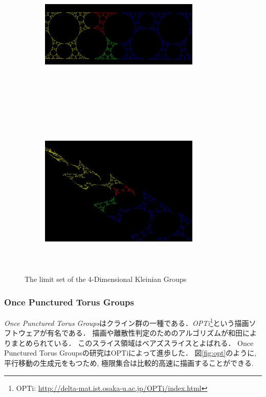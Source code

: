 \begin{figure}[h!tbp]
 \begin{subfigure}{0.49\hsize}
   \begin{center}
    \includegraphics[width=3in, height=3in, keepaspectratio]{../img/klein/sakugawa1.pdf}
    \caption{}
    \label{fig:sakugawa1}
   \end{center}
 \end{subfigure}
 \hspace*{\fill}
 \begin{subfigure}{0.49\hsize}
   \begin{center}
    \includegraphics[width=3in, height=3in, keepaspectratio]{../img/klein/sakugawa2.pdf}
    \caption{}
    \label{fig:sakugawa2}
   \end{center}
 \end{subfigure}
 \caption{The limit set of the 4-Dimensional Kleinian Groups}
 \label{fig:sakugawa}
\end{figure}

\subsubsection{Once Punctured Torus Groups}
{\it Once Punctured Torus Groups}はクライン群の一種である．{\it OPTi}\footnote{OPTi: \url{http://delta-mat.ist.osaka-u.ac.jp/OPTi/index.html}}という描画ソフトウェアが有名である．
描画\cite{OPTiDrawing}や離散性判定\cite{OPTiDiscrete}のためのアルゴリズムが和田によりまとめられている．
このスライス領域はベアズスライスとよばれる．
Once Punctured Torus Groupsの研究はOPTiによって進歩した．
図\ref{fig:opt}のように, 平行移動の生成元をもつため, 極限集合は比較的高速に描画することができる.

